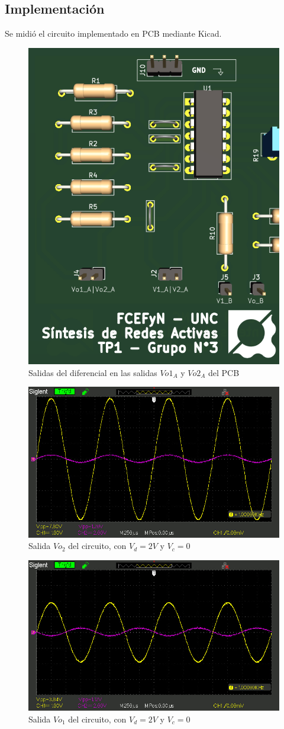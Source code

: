 \subsection{Implementación}

Se midió el circuito implementado en PCB mediante Kicad.

\begin{figure}[H]
    \centering
    \includegraphics[width=0.5\linewidth]{Secciones//Circuito1/3d_1.png}
    \caption{Salidas del diferencial en las salidas $Vo1_A$ y $Vo2_A$ del PCB}
    \label{fig:enter-label}
\end{figure}

\begin{figure}[H]
    \centering
    \includegraphics[width=.75\linewidth]{Secciones//Circuito1/oscilo1_1.jpg}
    \caption{Salida \(Vo_2\) del circuito, con $V_d = 2V$ y $V_c = 0$}
    \label{fig:enter-label}
\end{figure}

\begin{figure}[H]
    \centering
    \includegraphics[width=0.75\linewidth]{Secciones//Circuito1/oscilo1_2.jpg}
    \caption{Salida \(Vo_1\) del circuito, con $V_d = 2V$ y $V_c = 0$}
    \label{fig:enter-label}
\end{figure}

